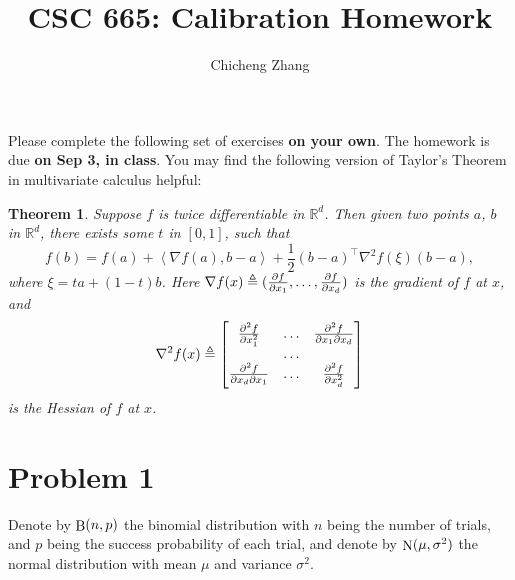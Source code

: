 \documentclass{article}
\title{CSC 665: Calibration Homework}
\author{Chicheng Zhang}
\newtheorem{theorem}{Theorem}
\DeclareMathOperator*{\Bin}{{\rm B}}
\DeclareMathOperator*{\N}{{\rm N}}
\newcommand{\RR}{\mathbb{R}} %
\newcommand{\defeq}{\triangleq}
\newcommand{\inner}[2]{\left\langle #1,#2 \right\rangle}
\begin{document}
\maketitle

Please complete the following set of exercises \textbf{on your own}.
The homework is due \textbf{on Sep 3, in class}.
You may find the following version of Taylor's Theorem in multivariate
calculus helpful:
\begin{theorem}
Suppose $f$ is twice differentiable in $\RR^d$. Then given two points $a$, $b$ in
$\RR^d$, there exists some $t$ in $[0,1]$, such that
\[ f(b) = f(a) + \inner{\nabla f(a)}{b - a} + \frac 1 2 (b - a)^\top \nabla^2 f(\xi) (b-a), \]
where $\xi = t a + (1-t) b$.
Here $\nabla f (x) \defeq (\pdv{f}{x_1}, \ldots, \pdv{f}{x_d})$ is the gradient of $f$ at $x$,
and
\[ \nabla^2 f (x) \defeq \begin{bmatrix} \pdv[2]{f}{x_1} & \ldots & \pdv{f}{x_1}{x_d} \\ & \ldots &  \\ \pdv{f}{x_d}{x_1} & \ldots & \pdv[2]{f}{x_d} \end{bmatrix}\]
is the Hessian of $f$ at $x$.
\end{theorem}


\section*{Problem 1}
Denote by $\Bin(n,p)$ the binomial distribution with $n$ being the number of trials,
and $p$ being the success probability of each trial,
and denote by $\N(\mu, \sigma^2)$ the normal distribution with mean $\mu$ and variance
$\sigma^2$.
\end{document}
